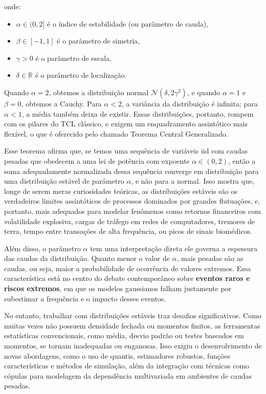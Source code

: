 \documentclass[
  letterpaper,
  DIV=11,
  numbers=noendperiod]{scrartcl}
\providecommand{\tightlist}{%
  \setlength{\itemsep}{0pt}\setlength{\parskip}{0pt}}\usepackage{longtable,booktabs,array}
\begin{document}
onde:

\begin{itemize}
\tightlist
\item
  \(\alpha \in (0, 2]\) é o índice de estabilidade (ou parâmetro de
  cauda),
\item
  \(\beta \in [-1,1]\) é o parâmetro de simetria,
\item
  \(\gamma > 0\) é o parâmetro de escala,
\item
  \(\delta \in \mathbb{R}\) é o parâmetro de localização.
\end{itemize}

Quando \(\alpha = 2\), obtemos a distribuição normal
\(\mathcal{N}(\delta, 2\gamma^2)\), e quando \(\alpha = 1\) e
\(\beta = 0\), obtemos a Cauchy. Para \(\alpha < 2\), a variância da
distribuição é infinita; para \(\alpha < 1\), a média também deixa de
existir. Essas distribuições, portanto, rompem com os pilares do TCL
clássico, e exigem um enquadramento assintótico mais flexível, o que é
oferecido pelo chamado Teorema Central Generalizado.

Esse teorema afirma que, se temos uma sequência de variáveis iid com
caudas pesadas que obedecem a uma lei de potência com expoente
\(\alpha \in (0,2)\), então a soma adequadamente normalizada dessa
sequência converge em distribuição para uma distribuição estável de
parâmetro \(\alpha\), e não para a normal. Isso mostra que, longe de
serem meras curiosidades teóricas, as distribuições estáveis são os
verdadeiros limites assintóticos de processos dominados por grandes
flutuações, e, portanto, mais adequados para modelar fenômenos como
retornos financeiros com volatilidade explosiva, cargas de tráfego em
redes de computadores, tremores de terra, tempo entre transações de alta
frequência, ou picos de sinais biomédicos.

Além disso, o parâmetro \(\alpha\) tem uma interpretação direta ele
governa a espessura das caudas da distribuição. Quanto menor o valor de
\(\alpha\), mais pesadas são as caudas, ou seja, maior a probabilidade
de ocorrência de valores extremos. Essa característica está no centro do
debate contemporâneo sobre \textbf{eventos raros e riscos extremos}, em
que os modelos gaussianos falham justamente por subestimar a frequência
e o impacto desses eventos.

No entanto, trabalhar com distribuições estáveis traz desafios
significativos. Como muitas vezes não possuem densidade fechada ou
momentos finitos, as ferramentas estatísticas convencionais, como média,
desvio padrão ou testes baseados em momentos, se tornam inadequadas ou
enganosas. Isso exigiu o desenvolvimento de novas abordagens, como o uso
de quantis, estimadores robustos, funções características e métodos de
simulação, além da integração com técnicas como cópulas para modelagem
da dependência multivariada em ambientes de caudas pesadas.
\end{document}
